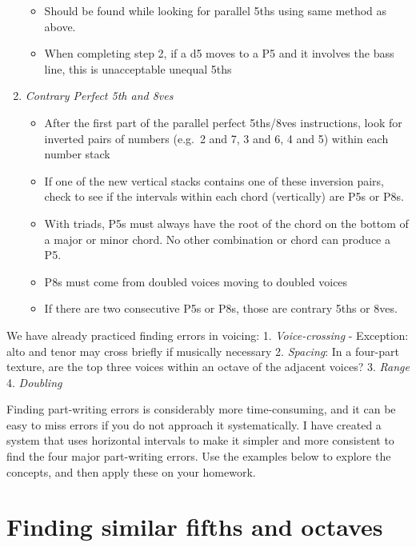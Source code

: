 \documentclass{book}
\providecommand{\tightlist}{%
  \setlength{\itemsep}{0pt}\setlength{\parskip}{0pt}}
\begin{document}
\begin{enumerate}
  \begin{itemize}
  \tightlist
  \item
    Should be found while looking for parallel 5ths using same method as
    above.
  \item
    When completing step 2, if a d5 moves to a P5 and it involves the bass
    line, this is unacceptable unequal 5ths
  \end{itemize}
\item
  \emph{Contrary Perfect 5th and 8ves}

  \begin{itemize}
  \tightlist
  \item
    After the first part of the parallel perfect 5ths/8ves instructions, look
    for inverted pairs of numbers (e.g.~2 and 7, 3 and 6, 4 and 5) within each
    number stack
  \item
    If one of the new vertical stacks contains one of these inversion pairs,
    check to see if the intervals within each chord (vertically) are P5s or
    P8s.
  \item
    With triads, P5s must always have the root of the chord on the bottom of a
    major or minor chord. No other combination or chord can produce a P5.
  \item
    P8s must come from doubled voices moving to doubled voices
  \item
    If there are two consecutive P5s or P8s, those are contrary 5ths or 8ves.
  \end{itemize}
\end{enumerate}

We have already practiced finding errors in voicing: 1. \emph{Voice-crossing}
- Exception: alto and tenor may cross briefly if musically necessary 2.
\emph{Spacing}: In a four-part texture, are the top three voices within an
octave of the adjacent voices? 3. \emph{Range} 4. \emph{Doubling}

Finding part-writing errors is considerably more time-consuming, and it can be
easy to miss errors if you do not approach it systematically. I have created a
system that uses horizontal intervals to make it simpler and more consistent
to find the four major part-writing errors. Use the examples below to explore
the concepts, and then apply these on your homework.

\hypertarget{finding-similar-fifths-and-octaves}{%
\section{Finding similar fifths and
octaves}\label{finding-similar-fifths-and-octaves}}
\end{document}
